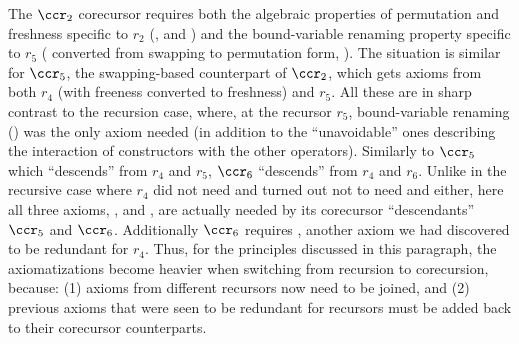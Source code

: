 The $\ccr_{2}$ corecursor requires both the algebraic properties of permutation and freshness specific to $r_2$ (\IPmId{}, \IPmCp{} and \IPmFv{}) and the bound-variable renaming property specific to $r_5$ (%
 converted from swapping %
 to permutation form, \IPmBvr{}).
 The situation is similar for $\ccr_{5}$, the swapping-based counterpart of $\ccr_{2}$, which gets axioms from both $r_4$ (with freeness 
 converted to freshness) and $r_5$. %
 All these are in sharp contrast to the recursion case, where, at the recursor $r_5$, bound-variable renaming (\SwBvr{}) was the only axiom needed (in addition to the ``unavoidable'' ones describing the  
 interaction of constructors with the other operators). 
%
% 
%
Similarly to $\ccr_5$ which ``descends'' from $r_4$ and $r_5$, 
$\ccr_{6}$ ``descends'' from $r_4$ and $r_6$. 
Unlike in the recursive case where $r_4$ did not need \SwCp{} and turned out not to need \SwId{} and \SwIv{} either, here all three axioms, \ISwId{}, \ISwIv{} and \SwCp{}, are actually needed by its corecursor ``descendants''  $\ccr_{5}$ and $\ccr_{6}$. Additionally $\ccr_{6}$ requires \IFvSw{}, another axiom we had discovered to be redundant for $r_4$. 
%
%
Thus, for the principles discussed in this paragraph, the axiomatizations become heavier when switching from recursion to corecursion, %
because: (1) axioms from different recursors now need to be joined, and (2) %
previous axioms that were seen to be redundant for recursors must be added back to their corecursor counterparts.

